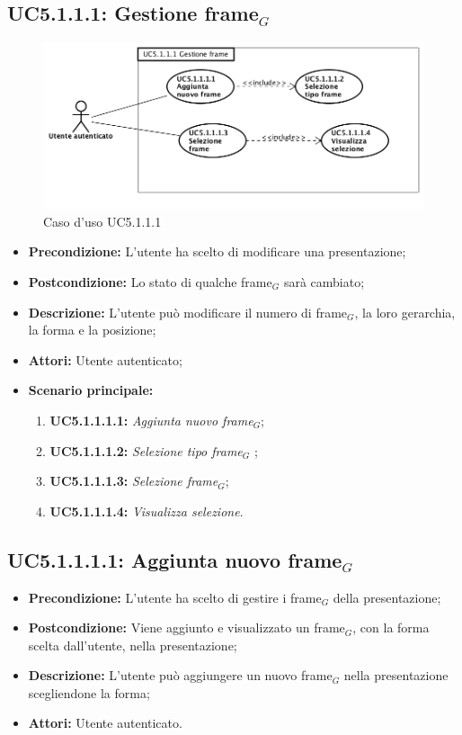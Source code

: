 \subsection{ UC5.1.1.1: Gestione frame$_G$}

\begin{figure}[h]
	\begin{center}
	\includegraphics[scale=0.4]{diagram/UC5-1-1-1.png}
	\caption{Caso d'uso UC5.1.1.1}
	\end{center}
\end{figure}
\begin{itemize}
	\item \textbf{Precondizione:} L'utente ha scelto di modificare una presentazione;
	\item \textbf{Postcondizione:} Lo stato di qualche frame$_G$ sarà cambiato;
	\item \textbf{Descrizione:} L'utente può modificare il numero di frame$_G$, la loro gerarchia, la forma e la posizione;
	\item \textbf{Attori:} Utente autenticato;
	\item \textbf{Scenario principale:}
	\begin{enumerate}
		\item \textbf{ UC5.1.1.1.1:} \textit{ Aggiunta nuovo frame$_G$};
		\item \textbf{ UC5.1.1.1.2:} \textit{ Selezione tipo frame$_G$ };
		\item \textbf{ UC5.1.1.1.3:} \textit{ Selezione frame$_G$};
		\item \textbf{ UC5.1.1.1.4:} \textit{ Visualizza selezione}.
	\end{enumerate}
\end{itemize}
\subsection{ UC5.1.1.1.1: Aggiunta nuovo frame$_G$}

\begin{itemize}
	\item \textbf{Precondizione:} L'utente ha scelto di gestire i frame$_G$ della presentazione;
	\item \textbf{Postcondizione:} Viene aggiunto e visualizzato un frame$_G$, con la forma scelta dall'utente, nella presentazione;
	\item \textbf{Descrizione:} L'utente può aggiungere un nuovo frame$_G$ nella presentazione scegliendone la forma;
	\item \textbf{Attori:} Utente autenticato.
\end{itemize}
